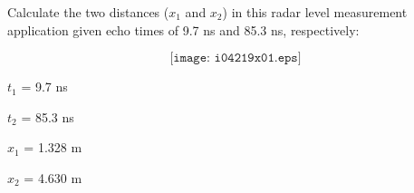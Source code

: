 

Calculate the two distances ($x_1$ and $x_2$) in this radar level measurement application given echo times of 9.7 ns and 85.3 ns, respectively:

$$\texttt{[image: i04219x01.eps]}$$

$t_1$ = 9.7 ns

\vskip 10pt

$t_2$ = 85.3 ns

\vskip 10pt







$x_1$ = 1.328 m

\vskip 10pt

$x_2$ = 4.630 m











